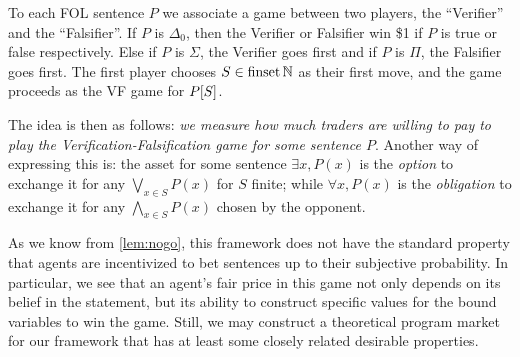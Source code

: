 \documentclass{article}
\begin{document}
\begin{definition}
    To each FOL sentence $P$ we associate a game between two players, the ``Verifier'' and the ``Falsifier''. If $P$ is $\Delta_0$, then the Verifier or Falsifier win \$1 if $P$ is true or false respectively. Else if $P$ is $\Sigma$, the Verifier goes first and if $P$ is $\Pi$, the Falsifier goes first. The first player chooses $S\in\operatorname{finset}{\mathbb{N}}$ as their first move, and the game proceeds as the VF game for $P[S]$.
    \label{def:vfgame}
\end{definition}

The idea is then as follows: \emph{we measure how much traders are willing to pay to play the Verification-Falsification game for some sentence $P$}. Another way of expressing this is: the asset for some sentence $\exists x,P(x)$ is the \emph{option} to exchange it for any $\bigvee_{x\in S}P(x)$ for $S$ finite; while $\forall x,P(x)$ is the \emph{obligation} to exchange it for any $\bigwedge_{x\in S}P(x)$ chosen by the opponent.

As we know from \ref{lem:nogo}, this framework does not have the standard property that agents are incentivized to bet sentences up to their subjective probability. In particular, we see that an agent's fair price in this game not only depends on its belief in the statement, but its ability to construct specific values for the bound variables to win the game. Still, we may construct a theoretical program market for our framework that has at least some closely related desirable properties.
\end{document}
